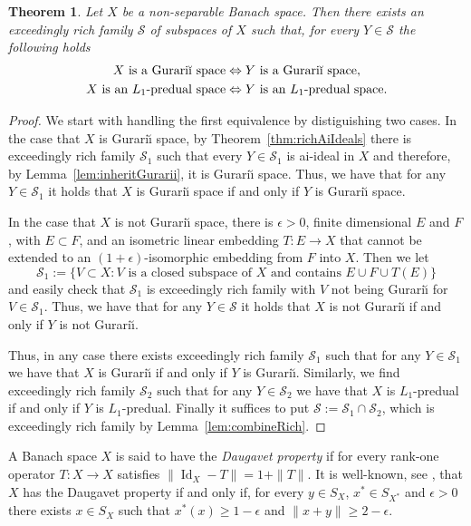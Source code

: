 \documentclass[11pt]{amsart}
\newtheorem{thm}{Theorem}
\theoremstyle{definition}
\theoremstyle{remark}
\newcommand{\SSS}{\mathcal S}
\newcommand{\Id}{\operatorname{Id}}
\begin{document}
\begin{thm}\label{thm:gurarii}
Let $X$ be a non-separable Banach space. Then there exists an exceedingly rich family $\SSS$ of subspaces of $X$ such that, for every $Y\in \SSS$ the following holds
\[\begin{split}
X \text{ is a Gurari\u{\i} space}  & \Leftrightarrow Y \text{ is a Gurari\u{\i} space},\\
X \text{ is an }L_1\text{-predual space}  & \Leftrightarrow Y \text{ is an } L_1\text{-predual space.}
\end{split}\]
\end{thm}
\begin{proof}
We start with handling the first equivalence by distiguishing two cases. In the case that $X$ is Gurari\u{\i} space, by Theorem~\ref{thm:richAiIdeals} there is exceedingly rich family $\SSS_1$ such that every $Y\in\SSS_1$ is ai-ideal in $X$ and therefore, by Lemma~\ref{lem:inheritGurarii}, it is Gurari\u{\i} space. Thus, we have that for any $Y\in\SSS_1$ it holds that $X$ is Gurari\u{\i} space if and only if $Y$ is Gurari\u{\i} space.

In the case that $X$ is not Gurari\u{\i} space, there is $\epsilon>0$, finite dimensional $E$ and $F$, with $E\subset F$, and an isometric linear embedding $T:E\to X$ that cannot be extended to an $(1+\epsilon)$-isomorphic embedding from $F$ into $X$. Then we let 
\[\SSS_1:=\{V\subset X\colon V\text{ is a closed subspace of }X \text{ and contains } E\cup F\cup T(E)\}\]
and easily check that $\SSS_1$ is exceedingly rich family with $V$ not being Gurari\u{\i} for $V\in \SSS_1$. Thus, we have that for any $Y\in\SSS$ it holds that $X$ is not Gurari\u{\i} if and only if $Y$ is not Gurari\u{\i}.

Thus, in any case there exists exceedingly rich family $\SSS_1$ such that for any $Y\in\SSS_1$ we have that $X$ is Gurari\u{\i} if and only if $Y$ is Gurari\u{\i}. Similarly, we find exceedingly rich family $\SSS_2$ such that for any $Y\in\SSS_2$ we have that $X$ is $L_1$-predual if and only if $Y$ is $L_1$-predual. Finally it suffices to put $\SSS:=\SSS_1\cap \SSS_2$, which is exceedingly rich family by Lemma~\ref{lem:combineRich}.
\end{proof}


A Banach space $X$ is said to have the \emph{Daugavet property} if for every rank-one operator $T:X\to X$ satisfies  
$\|\Id_X-T\|=1+\|T\|$. It is well-known, see \cite[Lemma 2.2]{Kadets2000}, that $X$ has the Daugavet property if and only if, for every $y \in S_X$, $x^* \in S_{X^*}$ and $\epsilon > 0$ there exists $x \in S_X$ such that
$x^*(x) \geq 1-\epsilon$ and $\|x + y\| \geq 2 - \epsilon$.
\end{document}
